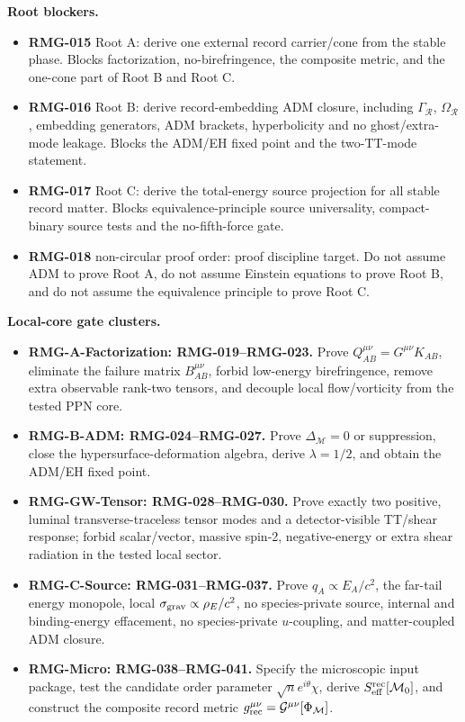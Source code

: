 \documentclass[11pt]{article}
\begin{document}
\medskip\noindent\textbf{Root blockers.}
\begin{itemize}
\item \textbf{RMG-015} Root A: derive one external record carrier/cone from the
stable phase.  Blocks factorization, no-birefringence, the composite metric,
and the one-cone part of Root B and Root C.
\item \textbf{RMG-016} Root B: derive record-embedding ADM closure, including
\(\Gamma_{\mathcal R}\), \(\Omega_{\mathcal R}\), embedding generators,
ADM brackets, hyperbolicity and no ghost/extra-mode leakage.  Blocks the
ADM/EH fixed point and the two-TT-mode statement.
\item \textbf{RMG-017} Root C: derive the total-energy source projection for
all stable record matter.  Blocks equivalence-principle source universality,
compact-binary source tests and the no-fifth-force gate.
\item \textbf{RMG-018} non-circular proof order: proof discipline target.  Do
not assume ADM to prove Root A, do not assume Einstein equations to prove
Root B, and do not assume the equivalence principle to prove Root C.
\end{itemize}

\medskip\noindent\textbf{Local-core gate clusters.}
\begin{itemize}
\item \textbf{RMG-A-Factorization: RMG-019--RMG-023.}  Prove
\(Q_{AB}^{\mu\nu}=G^{\mu\nu}K_{AB}\), eliminate the failure matrix
\(B_{AB}^{\mu\nu}\), forbid low-energy birefringence, remove extra observable
rank-two tensors, and decouple local flow/vorticity from the tested PPN core.
\item \textbf{RMG-B-ADM: RMG-024--RMG-027.}  Prove
\(\Delta_{\mathcal M}=0\) or suppression, close the hypersurface-deformation
algebra, derive \(\lambda=1/2\), and obtain the ADM/EH fixed point.
\item \textbf{RMG-GW-Tensor: RMG-028--RMG-030.}  Prove exactly two positive,
luminal transverse-traceless tensor modes and a detector-visible TT/shear
response; forbid scalar/vector, massive spin-2, negative-energy or extra shear
radiation in the tested local sector.
\item \textbf{RMG-C-Source: RMG-031--RMG-037.}  Prove
\(q_A\propto E_A/c^2\), the far-tail energy monopole, local
\(\sigma_{\rm grav}\propto\rho_E/c^2\), no species-private source, internal
and binding-energy effacement, no species-private \(u\)-coupling, and
matter-coupled ADM closure.
\item \textbf{RMG-Micro: RMG-038--RMG-041.}  Specify the microscopic input
package, test the candidate order parameter \(\sqrt n e^{i\theta}\chi\),
derive \(S_{\rm eff}^{\rm rec}[\mathcal M_0]\), and construct the composite
record metric \(g_{\rm rec}^{\mu\nu}=\mathcal G^{\mu\nu}[\Phi_{\mathcal M}]\).
\end{itemize}
\end{document}

